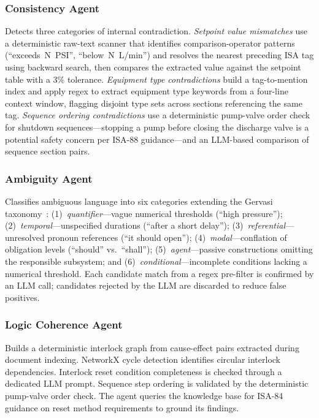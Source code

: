 \documentclass[journal]{IEEEtran}
\begin{document}
\subsubsection{Consistency Agent}
Detects three categories of internal contradiction. \textit{Setpoint value
mismatches} use a deterministic raw-text scanner that identifies
comparison-operator patterns (``exceeds~N~PSI'', ``below~N~L/min'') and
resolves the nearest preceding ISA tag using backward search, then compares
the extracted value against the setpoint table with a 3\% tolerance.
\textit{Equipment type contradictions} build a tag-to-mention index and apply
regex to extract equipment type keywords from a four-line context window,
flagging disjoint type sets across sections referencing the same tag.
\textit{Sequence ordering contradictions} use a deterministic pump-valve order
check for shutdown sequences---stopping a pump before closing the discharge
valve is a potential safety concern per ISA-88 guidance---and an LLM-based
comparison of sequence section pairs.

\subsubsection{Ambiguity Agent}
Classifies ambiguous language into six categories extending the Gervasi
taxonomy~\cite{gervasi2019}: (1)~\textit{quantifier}---vague numerical
thresholds (``high pressure''); (2)~\textit{temporal}---unspecified durations
(``after a short delay''); (3)~\textit{referential}---unresolved pronoun
references (``it should open''); (4)~\textit{modal}---conflation of obligation
levels (``should'' vs.~``shall''); (5)~\textit{agent}---passive constructions
omitting the responsible subsystem; and (6)~\textit{conditional}---incomplete
conditions lacking a numerical threshold. Each candidate match from a regex
pre-filter is confirmed by an LLM call; candidates rejected by the LLM are
discarded to reduce false positives.

\subsubsection{Logic Coherence Agent}
Builds a deterministic interlock graph from cause-effect pairs extracted during
document indexing. NetworkX cycle detection identifies circular interlock
dependencies. Interlock reset condition completeness is checked through a
dedicated LLM prompt. Sequence step ordering is validated by the deterministic
pump-valve order check. The agent queries the knowledge base for ISA-84 guidance
on reset method requirements to ground its findings.
\end{document}
